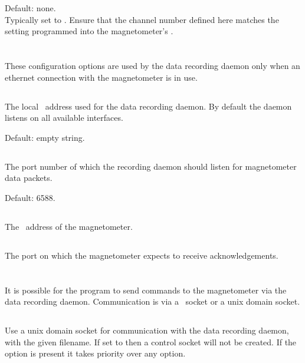 Default: none.\\
Typically set to . Ensure that the
channel number defined here matches the setting programmed into the
magnetometer's \eeprom.

\section{\code{[ethernet]}}

These configuration options are used by the data recording daemon only
when an ethernet connection with the magnetometer is in use.

\subsection{}
The local \ip\ address used for the data recording daemon. By default
the daemon listens on all available interfaces.

Default: empty string.

\subsection{}
The port number of which the recording daemon should listen for
magnetometer data packets.

Default: 6588.

\subsection{}
The \ip\ address of the magnetometer.

\subsection{}
The port on which the magnetometer expects to receive
acknowledgements.

\section{\code{[controlsocket]}}

It is possible for the  program to send commands
to the magnetometer via the data recording daemon. Communication is
via a \udp\ socket or a unix domain socket.

\subsection{}
Use a unix domain socket for communication with the data recording
daemon, with the given filename. If set to  then a
control socket will not be created. If the  option is
present it takes priority over any  option.

